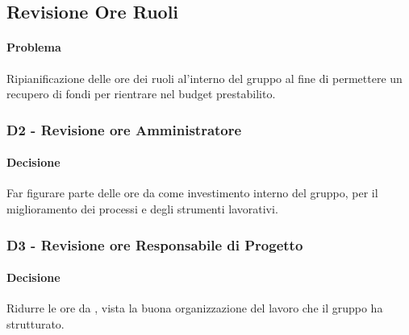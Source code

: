\subsection{Revisione Ore Ruoli}\label{pRuoli}
\paragraph{Problema}
Ripianificazione delle ore dei ruoli al'interno del gruppo al fine di permettere un recupero di fondi per rientrare nel budget prestabilito.
\subsubsection{\textbf{D2} - Revisione ore Amministratore}\label{d1Ruoli}
\paragraph{Decisione}
Far figurare parte delle ore da \rAP come investimento interno del gruppo, per il miglioramento dei processi e degli strumenti lavorativi.
\subsubsection{\textbf{D3} - Revisione ore Responsabile di Progetto}\label{d2Ruoli}
\paragraph{Decisione}
Ridurre le ore da \rRP, vista la buona organizzazione del lavoro che il gruppo ha strutturato.
